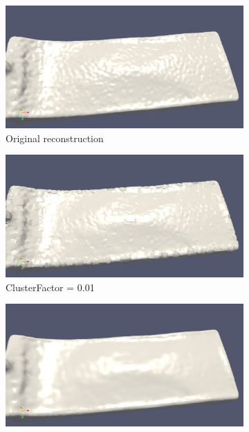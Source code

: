 \begin{figure}[h]
	\begin{center}
		\begin{subfigure}[b]{0.4\textwidth}
			\includegraphics[width=\textwidth]{figures/MlsSparseClustersOriginalpng.png}
			\caption{Original reconstruction} \label{fig:mls_clusters_original}
		\end{subfigure}
		\begin{subfigure}[b]{0.4\textwidth}
			\includegraphics[width=\textwidth]{figures/MlsSparseClusters0.01.png}
			\caption{ClusterFactor = 0.01} \label{fig:mls_clusters_sparse_0.01}
		\end{subfigure}
		\begin{subfigure}[b]{0.4\textwidth}
			\includegraphics[width=\textwidth]{figures/MlsSparseClusters0.5.png}

\end{subfigure}
\end{center}
\end{figure}
